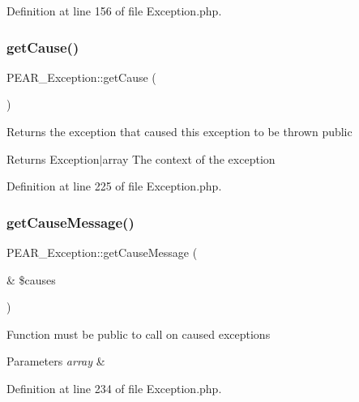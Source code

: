 Definition at line 156 of file Exception.\+php.

\mbox{\label{classPEAR__Exception_abc2aa18bf5cf14ab29e01d14eed7e041}} 
\subsubsection{\texorpdfstring{get\+Cause()}{getCause()}}
{\footnotesize\ttfamily P\+E\+A\+R\+\_\+\+Exception\+::get\+Cause (\begin{DoxyParamCaption}{ }\end{DoxyParamCaption})}

Returns the exception that caused this exception to be thrown  public \begin{DoxyReturn}{Returns}
Exception$\vert$array The context of the exception 
\end{DoxyReturn}


Definition at line 225 of file Exception.\+php.

\mbox{\label{classPEAR__Exception_a1c16ee57f4091d424c1bbcd904dda4f4}} 
\subsubsection{\texorpdfstring{get\+Cause\+Message()}{getCauseMessage()}}
{\footnotesize\ttfamily P\+E\+A\+R\+\_\+\+Exception\+::get\+Cause\+Message (\begin{DoxyParamCaption}\item[{\&}]{\$causes }\end{DoxyParamCaption})}

Function must be public to call on caused exceptions 
\begin{DoxyParams}{Parameters}
{\em array} & \\
\hline
\end{DoxyParams}


Definition at line 234 of file Exception.\+php.

\mbox{\label{classPEAR__Exception_a747dd232565b7e07ec7ef55e46405f4e}} 
